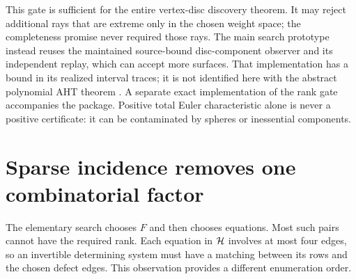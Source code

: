 This gate is sufficient for the entire vertex-disc discovery theorem.
It may reject additional rays that are extreme only in the chosen weight
space; the completeness promise never required those rays. The main
search prototype instead reuses the maintained source-bound disc-component
observer and its independent replay, which can accept more surfaces.
That implementation has a bound in its realized interval traces; it is
not identified here with the abstract polynomial AHT theorem \cite{aht}.
A separate exact implementation of the rank gate accompanies the package.
Positive total Euler characteristic alone is never a positive certificate:
it can be contaminated by spheres or inessential components.

\section{Sparse incidence removes one combinatorial factor}
\label{sec:incidence}

The elementary search chooses $F$ and then chooses equations. Most such
pairs cannot have the required rank. Each equation in $\mathcal H$ involves at
most four edges, so an invertible determining system must have a matching
between its rows and the chosen defect edges. This observation provides a
different enumeration order.

